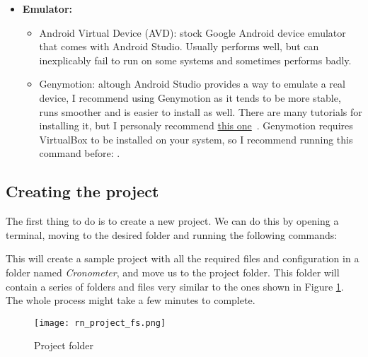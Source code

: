 \begin{itemize}
  \item \textbf{Emulator:}
    \begin{itemize}
      \item Android Virtual Device (AVD): stock Google Android device emulator that comes with Android Studio. Usually performs well, but can inexplicably fail to run on some systems and sometimes performs badly.~\cite{avd}
      \item Genymotion: altough Android Studio provides a way to emulate a real device, I recommend using Genymotion as it tends to be more stable, runs smoother and is easier to install as well. There are many tutorials for installing it, but I personaly recommend \href{http://techapple.net/2014/07/tutorial-installsetup-genymotion-android-emulator-linux-ubuntulinuxmintfedoraarchlinux/#}{this one}~\cite{genymotioninstall}. Genymotion requires VirtualBox to be installed on your system, so I recommend running this command before: .~\cite{genymotion}
    \end{itemize}
 

\end{itemize}

\subsection{Creating the project}

The first thing to do is to create a new project. We can do this by opening a terminal, moving to the desired folder and running the following commands:

\lstset{style=mybash}


This will create a sample project with all the required files and configuration in a folder named \textit{Cronometer}, and move us to the project folder. This folder will contain a series of folders and files very similar to the ones shown in Figure \ref{fig:rnprojectfs}. The whole process might take a few minutes to complete.

\begin{figure}[H]
	\centering
	\texttt{[image: rn\_project\_fs.png]}
	\caption{Project folder\label{fig:rnprojectfs}}
\end{figure}

